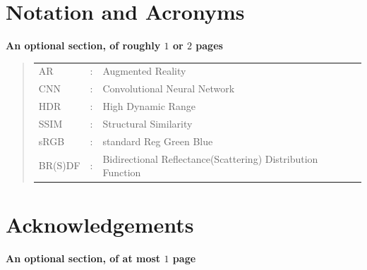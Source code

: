 \documentclass[ %
                    author={Gavin Parker},
                supervisor={Dr. Neill Campbell},
                    degree={MEng},
                     title={Deep Siamese Networks for Illumination Estimation from Stereo Images},
                  subtitle={},
                      type={research},
                      year={2018} ]{dissertation}
\begin{document}
\chapter*{Notation and Acronyms}

{\bf An optional section, of roughly $1$ or $2$ pages}
\vspace{1cm} 


\begin{quote}
\noindent
\begin{tabular}{lcl}
AR                 &:     & Augmented Reality                                         	\\
CNN                 &:     & Convolutional Neural Network                             	\\
HDR					&:		& High Dynamic Range										\\
SSIM				&:		& Structural Similarity										\\
sRGB				&:		& standard Reg Green Blue									\\
BR(S)DF				&:		& Bidirectional Reflectance(Scattering) Distribution Function
\end{tabular}
\end{quote}


\chapter*{Acknowledgements}

{\bf An optional section, of at most $1$ page}
\vspace{1cm} 

\noindent


%
\end{document}

